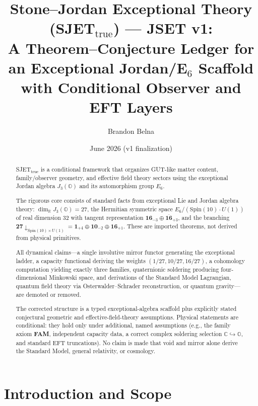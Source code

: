 \documentclass[11pt]{article}
\title{Stone--Jordan Exceptional Theory (SJET$_{\mathrm{true}}$) --- JSET v1:\\
\large A Theorem--Conjecture Ledger for an Exceptional Jordan/E$_6$ Scaffold with Conditional Observer and EFT Layers}
\author{Brandon Belna}
\date{June 2026 (v1 finalization)}
\theoremstyle{plain}
\theoremstyle{definition}
\theoremstyle{remark}
\numberwithin{equation}{section}
\newcommand{\R}{\mathbb{R}}
\newcommand{\Spin}{\mathrm{Spin}}
\begin{document}
\maketitle

\begin{abstract}
SJET$_{\mathrm{true}}$ is a conditional framework that organizes GUT-like matter content, family/observer geometry, and effective field theory sectors using the exceptional Jordan algebra $J_3(\mathbb{O})$ and its automorphism group $E_6$. 

The rigorous core consists of standard facts from exceptional Lie and Jordan algebra theory: $\dim_{\R} J_3(\mathbb{O}) = 27$, the Hermitian symmetric space $E_6/(\Spin(10)\cdot U(1))$ of real dimension 32 with tangent representation $\mathbf{16}_{-3}\oplus\overline{\mathbf{16}}_{+3}$, and the branching $\mathbf{27}\downarrow_{\Spin(10)\times U(1)} = \mathbf{1}_{+4}\oplus\mathbf{10}_{-2}\oplus\mathbf{16}_{+1}$. These are imported theorems, not derived from physical primitives.

All dynamical claims---a single involutive mirror functor generating the exceptional ladder, a capacity functional deriving the weights $(1/27,10/27,16/27)$, a cohomology computation yielding exactly three families, quaternionic soldering producing four-dimensional Minkowski space, and derivations of the Standard Model Lagrangian, quantum field theory via Osterwalder--Schrader reconstruction, or quantum gravity---are demoted or removed. 

The corrected structure is a typed exceptional-algebra scaffold plus explicitly stated conjectural geometric and effective-field-theory assumptions. Physical statements are conditional: they hold only under additional, named assumptions (e.g., the family axiom \textbf{FAM}, independent capacity data, a correct complex soldering selection $\mathbb{C}\hookrightarrow\mathbb{O}$, and standard EFT truncations). No claim is made that void and mirror alone derive the Standard Model, general relativity, or cosmology.
\end{abstract}

\tableofcontents
\clearpage

\section{Introduction and Scope}
\end{document}

